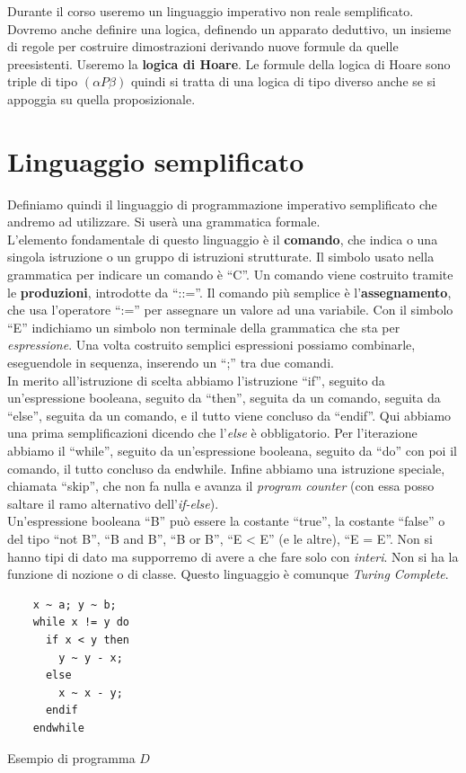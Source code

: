\documentclass[a4paper,12pt, oneside]{book}
\begin{document}
Durante il corso useremo un linguaggio imperativo non reale semplificato.
Dovremo anche definire una logica, definendo un apparato deduttivo, un insieme
di regole per costruire dimostrazioni derivando nuove formule da quelle
preesistenti. Useremo la \textbf{logica di Hoare}. Le formule della logica di
Hoare sono triple di tipo $(\alpha P \beta)$ quindi si tratta di una logica di tipo diverso
anche se si appoggia su quella proposizionale.
\section{Linguaggio semplificato}
Definiamo quindi il linguaggio di programmazione imperativo semplificato che
andremo ad utilizzare. Si userà una grammatica formale.\\
L'elemento fondamentale di questo linguaggio è il \textbf{comando}, che indica o
una singola istruzione o un gruppo di istruzioni strutturate. Il simbolo usato
nella grammatica per indicare un comando è ``C''. Un comando viene costruito
tramite le \textbf{produzioni}, introdotte da ``::=''. Il comando più semplice è
l'\textbf{assegnamento}, che usa l'operatore ``:='' per assegnare un valore ad
una variabile. Con il simbolo ``E'' indichiamo un simbolo non terminale della
grammatica che sta per \textit{espressione}. Una volta costruito semplici
espressioni possiamo combinarle, eseguendole in sequenza, inserendo un ``;'' tra
due comandi.\\ 
In merito all'istruzione di scelta abbiamo l'istruzione ``if'', seguito da
un'espressione booleana, seguito da ``then'', seguita da un comando, seguita da
``else'', seguita da un comando, e il tutto viene concluso da ``endif''. Qui
abbiamo una prima semplificazioni dicendo che l'\textit{else} è
obbligatorio. Per l'iterazione abbiamo il ``while'', seguito da un'espressione
booleana, seguito da ``do'' con poi il comando, il tutto concluso da
endwhile. Infine abbiamo una istruzione speciale, chiamata ``skip'', che non fa
nulla e avanza il \textit{program counter} (con essa posso saltare il ramo
alternativo dell'\textit{if-else}).\\
Un'espressione booleana ``B'' può essere la costante ``true'', la costante
``false'' o del tipo ``not B'', ``B and B'', ``B or B'', ``E < E'' (e le altre),
``E = E''. Non si hanno tipi di dato ma supporremo di avere a che fare solo con
\textit{interi}. Non si ha la funzione di nozione o di classe. Questo linguaggio
è comunque \textit{Turing Complete}.
\begin{listing}[H]
  \begin{lstlisting}
    x ~ a; y ~ b;
    while x != y do
      if x < y then
        y ~ y - x;
      else
        x ~ x - y;
      endif
    endwhile  
  \end{lstlisting}
  \caption{Esempio di programma $D$}
  \label{listing:D}
\end{listing}
\end{document}
